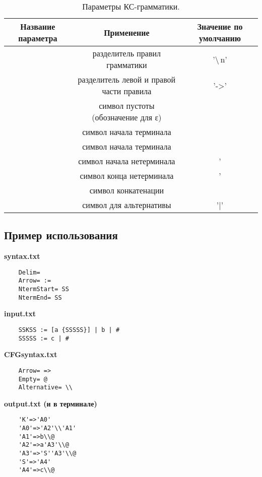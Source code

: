 \documentclass{article}
\begin{document}
\begin{table}[h!]
\centering
\begin{tabular}{ |c | c | c| }
\hline 
Название параметра & Применение	& Значение по умолчанию \\ [0.5ex]
\hline
[Delim]	& разделитель правил грамматики	& '\backslash\,n' \\ [0.5ex]
\hline
[Arrow]	& разделитель левой и правой части правила	& '->' \\ [0.5ex]
\hline
[Empty] & символ пустоты (обозначение для ε) &  \\ [0.5ex]
\hline
[TermStart]	& символ начала терминала &  \\ [0.5ex]
\hline
[TermEnd] & символ начала терминала &  \\ [0.5ex]
\hline
[NtermStart] & символ начала нетерминала & ' \\ [0.5ex]
\hline
[NtermEnd] & символ конца нетерминала & ' \\ [0.5ex]
\hline
[Concat] & символ конкатенации &  \\ [0.5ex]
\hline
[Alternative] & символ для альтернативы & '|' \\ [0.5ex]
\hline
\end{tabular}
\caption{Параметры КС-грамматики.}
\end{table}

\subsection{Пример использования}
\textbf{syntax.txt}
\begin{lstlisting}   
    Delim= 
    Arrow= :=
    NtermStart= SS
    NtermEnd= SS
\end{lstlisting}

\textbf{input.txt}
\begin{lstlisting}   
    SSKSS := [a {SSSSS}] | b | # 
    SSSSS := c | #
\end{lstlisting}

\textbf{CFGsyntax.txt}
\begin{lstlisting}   
    Arrow= =>
    Empty= @
    Alternative= \\
\end{lstlisting}

\textbf{output.txt (и в терминале)}
\begin{lstlisting}   
    'K'=>'A0'
    'A0'=>'A2'\\'A1'
    'A1'=>b\\@
    'A2'=>a'A3'\\@
    'A3'=>'S''A3'\\@
    'S'=>'A4'
    'A4'=>c\\@
\end{lstlisting}
\end{document}
